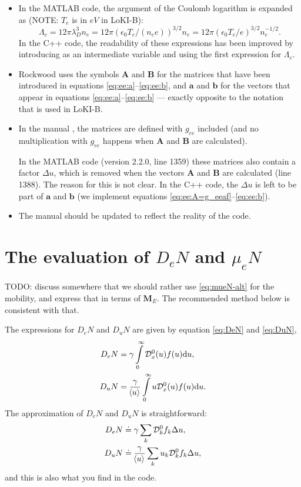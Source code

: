 \documentclass{book}
\newcommand{\MEAN}[1]{\ensuremath{\!\left\langle{{#1}}\right\rangle}}
\newcommand{\bmat}[1]{{\ensuremath{\bm {#1}}}}
\newcommand{\bvec}[1]{{\ensuremath{\bm {#1}}}}
\begin{document}
\begin{framed}
\begin{itemize}
\begin{enumerate}
    \end{enumerate}
  \item In the MATLAB code, the argument of the Coulomb logarithm is expanded as
    (NOTE: $T_e$ is in $\si{eV}$ in LoKI-B):
    \begin{equation}
      \Lambda_c
      = 12\pi\lambda_D^3n_e = 12\pi\left(\epsilon_0T_e/(n_ee)\right)^{3/2}n_e
      = 12\pi\left(\epsilon_0 T_e/e\right)^{3/2}n_e^{-1/2}.
    \end{equation}
    In the C++ code, the readability of these expressions has been improved by
    introducing  as an intermediate variable and using the first
    expression for $\Lambda_c$.
  \item Rockwood uses the symbols $\bmat{A}$ and $\bmat{B}$ for the matrices
	that have been introduced in equations \eqref{eq:ee:a}--\eqref{eq:ee:b},
	and $\bvec{a}$ and $\bvec{b}$ for the vectors that appear in equations
	\eqref{eq:ee:a}--\eqref{eq:ee:b} --- exactly opposite to the notation
	that is used in LoKI-B.
  \item In the manual \cite[eq. 39a,b,f,g]{Tejero2019}, the matrices are
	defined with $g_{ee}$ included (and no multiplication with $g_{ee}$
	happens when $\bvec{A}$ and $\bvec{B}$ are calculated).

	In the MATLAB code (version 2.2.0,  line 1359)
	these matrices also contain a factor $\Delta u$, which is
	removed when the vectors $\bvec{A}$ and $\bvec{B}$ are calculated (line 1388).
	The reason for this is not clear. In the C++ code, the $\Delta u$
	is left to be part of $\bmat{a}$ and $\bmat{b}$ (we implement equations
	\eqref{eq:ee:A=g_eeaf}--\eqref{eq:ee:b}).
  \item The manual should be updated to reflect the reality of the code.
\end{itemize}
\end{framed}

\section{The evaluation of $D_eN$ and $\mu_eN$}
\label{sec:muD-eval}

TODO: discuss somewhere that we should rather use \eqref{eq:mueN-alt} for
the mobility, and express that in terms of $\bmat{M}_E$. The recommended method
below is consistent with that.


The expressions for $D_eN$ and $D_uN$ are given by equation \eqref{eq:DeN} and \eqref{eq:DuN},
\begin{align*}
	D_eN &= \gamma\int\limits_0^\infty {\cal D}_x^0(u)f(u)\dd{u}, \\
	D_uN &= \frac{\gamma}{\MEAN{u}}\int\limits_0^\infty u{\cal D}_{x}^0(u)f(u)\dd{u}.
\end{align*}
The approximation of $D_eN$ and $D_uN$ is straightforward:
\begin{align}
	D_eN &\doteq \gamma \sum_k {\cal D}^0_kf_k\Delta u,
	\label{eq:DeN-disc} \\
	D_uN &\doteq \frac{\gamma}{\MEAN{u}} \sum_k u_k{\cal D}^0_kf_k\Delta u,
	\label{eq:DuN-disc}
\end{align}
and this is also what you find in the code.
\end{document}
